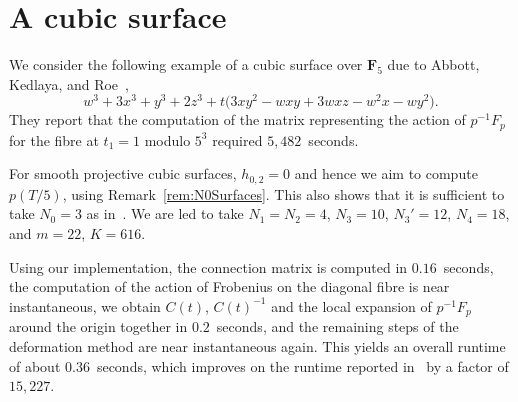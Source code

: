 \section{A cubic surface}

We consider the following example of a cubic surface over 
$\mathbf{F}_5$ due to Abbott, Kedlaya, and 
Roe~\citep[Example~4.3.2]{AbbottKedlayaRoe2006},
\begin{equation*}
w^3 + 3 x^3 + y^3 + 2 z^3 
+ t \bigl( 3 x y^2 - w x y + 3 w x z - w^2 x - w y^2 \bigr).
\end{equation*}
They report that the computation of the matrix representing 
the action of $p^{-1} F_p$ for the fibre at $t_1 = 1$ modulo 
$5^3$ required $5,482$~seconds.

For smooth projective cubic surfaces, $h_{0,2} = 0$ and hence 
we aim to compute $p(T/5)$, using Remark~\ref{rem:N0Surfaces}. 
This also shows that it is sufficient to take $N_0 = 3$ as 
in~\citep{AbbottKedlayaRoe2006}.  We are led to 
take $N_1 = N_2 = 4$, $N_3 = 10$, $N_3' = 12$, $N_4 = 18$, and 
$m = 22$, $K = 616$.

Using our implementation, the connection matrix is computed 
in $0.16$~seconds, the computation of the action of Frobenius 
on the diagonal fibre is near instantaneous, we obtain $C(t)$, 
$C(t)^{-1}$ and the local expansion of $p^{-1} F_p$ around the 
origin together in $0.2$~seconds, and the remaining steps of 
the deformation method are near instantaneous again.  This yields 
an overall runtime of about $0.36$~seconds, which improves on 
the runtime reported in~\citep{AbbottKedlayaRoe2006} by a factor 
of $15,227$.

